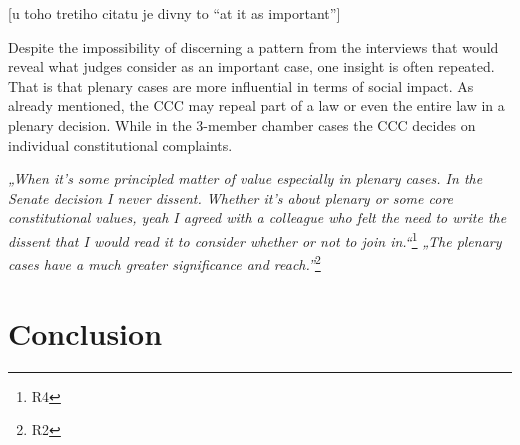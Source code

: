 \documentclass[
  11pt,
]{article}
\begin{document}
{[}u toho tretiho citatu je divny to ``at it as important''{]}

Despite the impossibility of discerning a pattern from the interviews that would reveal what judges consider as an important case, one insight is often repeated. That is that plenary cases are more influential in terms of social impact. As already mentioned, the CCC may repeal part of a law or even the entire law in a plenary decision. While in the 3-member chamber cases the CCC decides on individual constitutional complaints.

\emph{„When it's some principled matter of value especially in plenary cases. In the Senate decision I never dissent. Whether it's about plenary or some core constitutional values, yeah I agreed with a colleague who felt the need to write the dissent that I would read it to consider whether or not to join in.``}\footnote{R4}
\emph{„The plenary cases have a much greater significance and reach.''}\footnote{R2}

\section*{Conclusion}\label{conclusion}
\end{document}
